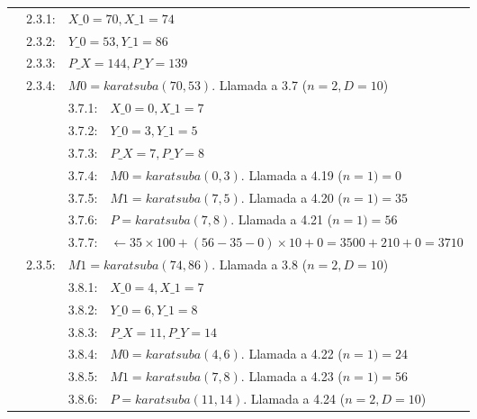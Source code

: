 \documentclass[titlepage,a4paper]{article}
\begin{document}
\begin{longtable}[r]{lllllll}
\multicolumn{2}{l}{}     & 2.3.1:     & \multicolumn{4}{l}{$X\_0=70, X\_1=74$}     \\
\multicolumn{2}{l}{}     & 2.3.2:     & \multicolumn{4}{l}{$Y\_0=53, Y\_1=86$}     \\
\multicolumn{2}{l}{}     & 2.3.3:     & \multicolumn{4}{l}{$P\_X=144, P\_Y=139$}     \\
\multicolumn{2}{l}{}     & 2.3.4:     & \multicolumn{4}{l}{$M0=karatsuba(70,53)$. Llamada a 3.7 ($n=2,D=10$)}     \\
\multicolumn{3}{l}{}     & 3.7.1:     & \multicolumn{3}{l}{$X\_0=0, X\_1=7$}     \\
\multicolumn{3}{l}{}     & 3.7.2:     & \multicolumn{3}{l}{$Y\_0=3, Y\_1=5$}     \\
\multicolumn{3}{l}{}     & 3.7.3:     & \multicolumn{3}{l}{$P\_X=7, P\_Y=8$}     \\
\multicolumn{3}{l}{}     & 3.7.4:     & \multicolumn{3}{l}{$M0=karatsuba(0,3)$. Llamada a 4.19 ($n=1) = \boxed{0}$}     \\
\multicolumn{3}{l}{}     & 3.7.5:     & \multicolumn{3}{l}{$M1=karatsuba(7,5)$. Llamada a 4.20 ($n=1) = \boxed{35}$}     \\
\multicolumn{3}{l}{}     & 3.7.6:     & \multicolumn{3}{l}{$P=karatsuba(7,8)$. Llamada a 4.21 ($n=1) = \boxed{56}$}     \\
\multicolumn{3}{l}{}     & 3.7.7:     & \multicolumn{3}{l}{$\leftarrow 35\times 100 + (56-35-0)\times 10 + 0 =  3500 + 210 + 0 = \boxed{3710}$}     \\
\multicolumn{2}{l}{}     & 2.3.5:     & \multicolumn{4}{l}{$M1=karatsuba(74,86)$. Llamada a 3.8 ($n=2,D=10$)}     \\
\multicolumn{3}{l}{}     & 3.8.1:     & \multicolumn{3}{l}{$X\_0=4, X\_1=7$}     \\
\multicolumn{3}{l}{}     & 3.8.2:     & \multicolumn{3}{l}{$Y\_0=6, Y\_1=8$}     \\
\multicolumn{3}{l}{}     & 3.8.3:     & \multicolumn{3}{l}{$P\_X=11, P\_Y=14$}     \\
\multicolumn{3}{l}{}     & 3.8.4:     & \multicolumn{3}{l}{$M0=karatsuba(4,6)$. Llamada a 4.22 ($n=1) = \boxed{24}$}     \\
\multicolumn{3}{l}{}     & 3.8.5:     & \multicolumn{3}{l}{$M1=karatsuba(7,8)$. Llamada a 4.23 ($n=1) = \boxed{56}$}     \\
\multicolumn{3}{l}{}     & 3.8.6:     & \multicolumn{3}{l}{$P=karatsuba(11,14)$. Llamada a 4.24 ($n=2,D=10$)}     \\

\end{longtable}
\end{document}
